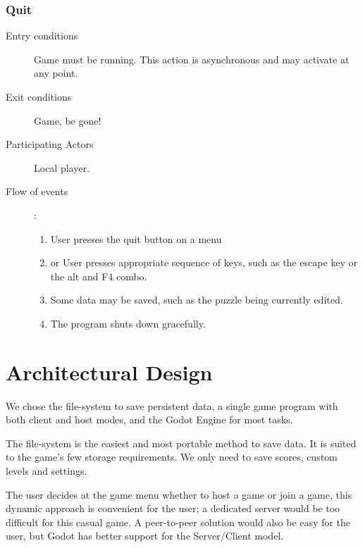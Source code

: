 \documentclass[12pt]{article}
\begin{document}
\begin{mdframed}
    \subsubsection{Quit}
    \begin{description}
        \item[Entry conditions] Game must be running. This action is
            asynchronous and may activate at any point.
        \item[Exit conditions] Game, be gone!
        \item[Participating Actors] Local player.
        \item[Flow of events]:
            \begin{enumerate}
                \item User presses the quit button on a menu
                \item or User presses appropriate sequence of keys, such as
                    the escape key or the alt and F4 combo.
                \item Some data may be saved, such as the puzzle being currently
                edited.
                \item The program shuts down gracefully.
            \end{enumerate}
    \end{description}
\end{mdframed}



\section{Architectural Design}

We chose the file-system to save persistent data, a single game program with
both client and host modes, and the Godot Engine for most tasks.

The file-system is the easiest and most portable method to save data. It is
suited to the game's few storage requirements. We only need to save scores,
custom levels and settings.

The user decides at the game menu whether to host a game or join a game, this
dynamic approach is convenient for the user; a dedicated server
would be too difficult for this casual game. A peer-to-peer solution would
also be easy for the user, but Godot has better support for the Server/Client
model.
\end{document}
